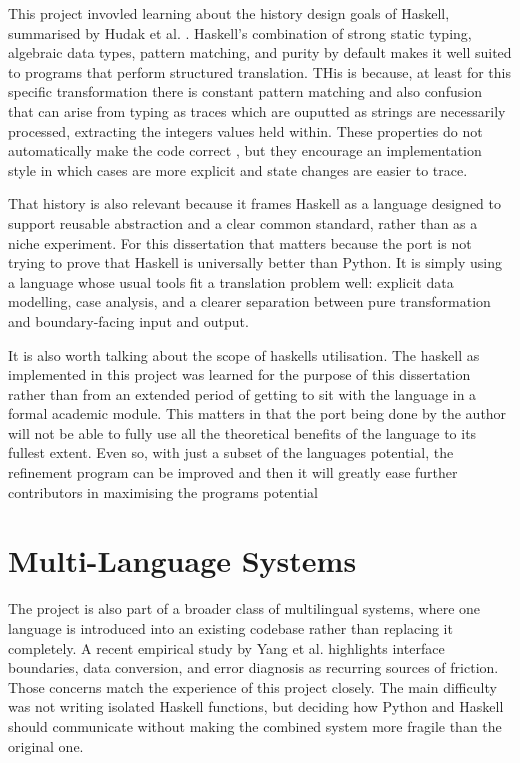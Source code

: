This project invovled learning about the history design goals of Haskell, summarised by Hudak et al. \citep{hudak2007history}. Haskell's combination of strong static typing, algebraic data types, pattern matching, and purity by default makes it well suited to programs that perform structured translation. THis is because, at least for this specific transformation there is constant pattern matching and also confusion that can arise from typing as traces which are ouputted as strings are necessarily processed, extracting the integers values held within. These properties do not automatically make the code correct , but they encourage an implementation style in which cases are more explicit and state changes are easier to trace.

That history is also relevant because it frames Haskell as a language designed to support reusable abstraction and a clear common standard, rather than as a niche experiment. For this dissertation that matters because the port is not trying to prove that Haskell is universally better than Python. It is simply using a language whose usual tools fit a translation problem well: explicit data modelling, case analysis, and a clearer separation between pure transformation and boundary-facing input and output.

It is also worth talking about the scope of haskells utilisation. The haskell as implemented in this project was learned for the purpose of this dissertation rather than from an extended period of getting to sit with the language in a formal academic module. This matters in that the port being done by the author will not be able to fully use all the theoretical benefits of the language to its fullest extent. Even so, with just a subset of the languages potential, the refinement program can be improved and then it will greatly ease further contributors in maximising the programs potential

\section{Multi-Language Systems}

The project is also part of a broader class of multilingual systems, where one language is introduced into an existing codebase rather than replacing it completely. A recent empirical study by Yang et al. \citep{yang2024multilanguage} highlights interface boundaries, data conversion, and error diagnosis as recurring sources of friction. Those concerns match the experience of this project closely. The main difficulty was not writing isolated Haskell functions, but deciding how Python and Haskell should communicate without making the combined system more fragile than the original one.


